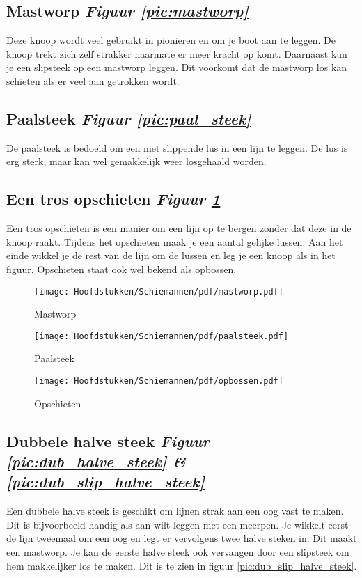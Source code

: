 \subsection{Mastworp \hfill \textit{Figuur \ref{pic:mastworp}}}
Deze knoop wordt veel gebruikt in pionieren en om je boot aan te leggen. De knoop trekt zich zelf strakker naarmate er meer kracht op komt. Daarnaast kun je een slipsteek op een mastworp leggen. Dit voorkomt dat de mastworp los kan schieten als er veel aan getrokken wordt.
\subsection{Paalsteek \hfill \textit{Figuur \ref{pic:paal_steek}}} 
De paalsteek is bedoeld om een niet slippende lus in een lijn te leggen. De lus is erg sterk, maar kan wel gemakkelijk weer losgehaald worden.
\subsection{Een tros opschieten \hfill \textit{Figuur \ref{pic:opschieten}}}
Een tros opschieten is een manier om een lijn op te bergen zonder dat deze in de knoop raakt. Tijdens het opschieten maak je een aantal gelijke lussen. Aan het einde wikkel je de rest van de lijn om de lussen en leg je een knoop als in het figuur. Opschieten staat ook wel bekend als opbossen.
\begin{figure}[h]
  \centering
  \begin{minipage}[b]{0.32\textwidth}
  \centering
    \texttt{[image: Hoofdstukken/Schiemannen/pdf/mastworp.pdf]}
    \caption{Mastworp}
    \label{pic:mastworp}
  \end{minipage}
  \hfill
  \begin{minipage}[b]{0.32\textwidth}
    \centering
    \texttt{[image: Hoofdstukken/Schiemannen/pdf/paalsteek.pdf]}
    \caption{Paalsteek}
    \label{pic:paal_steek}
    \end{minipage}
  \hfill
   \begin{minipage}[b]{0.32\textwidth}
    \centering
    \texttt{[image: Hoofdstukken/Schiemannen/pdf/opbossen.pdf]}
    \caption{Opschieten}
    \label{pic:opschieten}
    \end{minipage}
\end{figure}


\subsection{Dubbele halve steek \hfill \textit{Figuur \ref{pic:dub_halve_steek} \& \ref{pic:dub_slip_halve_steek}}}
Een dubbele halve steek is geschikt om lijnen strak aan een oog vast te maken. Dit is bijvoorbeeld handig als aan wilt leggen met een meerpen. Je wikkelt eerst de lijn tweemaal om een oog en legt er vervolgens twee halve steken in. Dit maakt een mastworp. Je kan de eerste halve steek ook vervangen door een slipsteek om hem makkelijker los te maken. Dit is te zien in figuur \ref{pic:dub_slip_halve_steek}.



